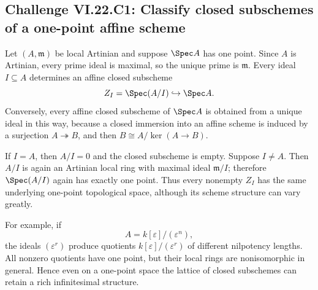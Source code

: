 \subsection*{Challenge VI.22.C1: Classify closed subschemes of a one-point affine scheme}
\begin{solution}
Let $(A,\mathfrak m)$ be local Artinian and suppose $\Spec A$ has one point.  Since $A$ is
Artinian, every prime ideal is maximal, so the unique prime is $\mathfrak m$.  Every ideal
$I\subseteq A$ determines an affine closed subscheme
\[
 Z_I=\Spec(A/I)\hookrightarrow\Spec A.
\]
Conversely, every affine closed subscheme of $\Spec A$ is obtained from a unique ideal in this
way, because a closed immersion into an affine scheme is induced by a surjection
$A\twoheadrightarrow B$, and then $B\cong A/\ker(A\to B)$.

If $I=A$, then $A/I=0$ and the closed subscheme is empty.  Suppose $I\neq A$.  Then
$A/I$ is again an Artinian local ring with maximal ideal $\mathfrak m/I$; therefore
$\Spec(A/I)$ again has exactly one point.  Thus every nonempty $Z_I$ has the same underlying
one-point topological space, although its scheme structure can vary greatly.

For example, if
\[
 A=k[\varepsilon]/(\varepsilon^n),
\]
the ideals $(\varepsilon^r)$ produce quotients
$k[\varepsilon]/(\varepsilon^r)$ of different nilpotency lengths.  All nonzero quotients have
one point, but their local rings are nonisomorphic in general.  Hence even on a one-point
space the lattice of closed subschemes can retain a rich infinitesimal structure.
\end{solution}

